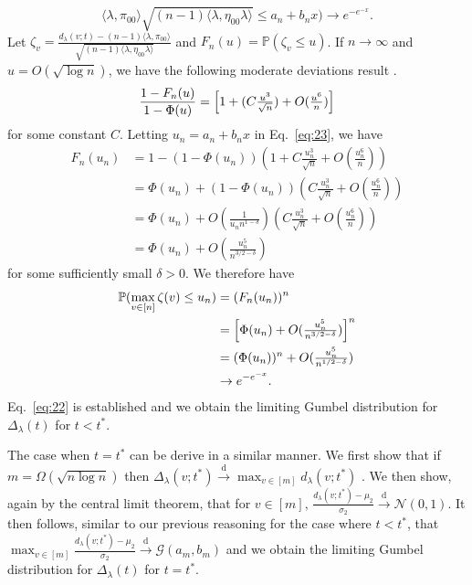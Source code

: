 \documentclass[10pt,journal,compsoc]{IEEEtran}
\theoremstyle{definition}
\begin{document}
\begin{IEEEproof}[Proposition~5]
\begin{equation}
{      \langle \lambda, \pi_{00} \rangle}{\sqrt{(n-1) \langle
        \lambda, \eta_{00} \lambda \rangle}} \leq a_n + b_n x\Big)
    \rightarrow 
    e^{-e^{-x}}. 
  \end{equation}
  Let $\zeta_v = \tfrac{d_{\lambda}(v;t) - (n-1) \langle \lambda,
    \pi_{00} \rangle}{\sqrt{(n-1) \langle \lambda, \eta_{00} \lambda
      \rangle}}$ and $F_n(u) = \mathbb{P}(\zeta_v \leq u)$. If $n
  \rightarrow \infty$ and $u = O(\sqrt{\log{n}})$, we have the
  following moderate deviations result \cite[Theorem~2, \S
  XVI.7]{feller71:_introd_probab_theor_its_applic,rubin65:_probab}.
  \begin{equation}
    \label{eq:23}
    \frac{1 - F_{n}(u)}{1 - \Phi(u)} = \Bigl[1 + (C\tfrac{u^{3}}{\sqrt{n}}) + O(\tfrac{u^{6}}{n}) \Bigr]
  \end{equation}
  for some constant $C$. Letting $u_n = a_n + b_n x$ in
  Eq.~\eqref{eq:23}, we have
  \begin{equation*}
    \begin{split}
      F_n(u_n) &= 1 - (1 - \Phi(u_n))(1 + C \tfrac{u_n^{3}}{\sqrt{n}} +
      O(\tfrac{u_n^{6}}{n})) \\
      &= \Phi(u_n) + (1 - \Phi(u_n))(C \tfrac{u_n^{3}}{\sqrt{n}} +
      O(\tfrac{u_n^6}{n})) \\
      &= \Phi(u_n) + O(\tfrac{1}{u_n n^{1- \delta}})(C \tfrac{u_n^{3}}{\sqrt{n}} +
      O(\tfrac{u_n^6}{n})) \\
      &= \Phi(u_n) + O(\tfrac{u_n^{5}}{n^{3/2 - \delta}})
    \end{split}
  \end{equation*}
  for some sufficiently small $\delta > 0$. We therefore have
  \begin{equation}
    \label{eq:25}
    \begin{split}
      \mathbb{P}(\max_{v \in [n]} \zeta(v) \leq u_n) &= (F_n(u_n))^{n} \\
      &= \Bigl[\Phi(u_n) + O(\tfrac{u_n^{5}}{n^{3/2 - \delta}})\Bigr]^{n} \\
      &= (\Phi(u_n))^{n} + O(\tfrac{u_n^{5}}{n^{1/2 - \delta}}) \\
      & \rightarrow e^{-e^{-x}}. 
    \end{split}
  \end{equation}
  Eq.~\eqref{eq:22} is established and we obtain the limiting Gumbel distribution for
  $\Delta_{\lambda}(t)$ for $t < t^{*}$.
  
  The case when $t = t^{*}$ can be derive in a similar manner. We
  first show that if $m = \Omega(\sqrt{n \log n})$ then
  $\Delta_{\lambda}(v;t^{*}) \overset{\mathrm{d}}{\longrightarrow}
  \max_{v \in [m]}{d_{\lambda}(v;t^{*})}$ \cite[Lemma
  3.1]{rukhin12}. We then show, again by
  the central limit theorem, that for $v \in [m]$,
  $\tfrac{d_{\lambda}(v;t^{*}) - \mu_2}{\sigma_2}
  \overset{\mathrm{d}}{\longrightarrow} \mathcal{N}(0,1)$. It then
  follows, similar to our previous reasoning for the case where $t <
  t^{*}$, that $\max_{v \in [m]} \tfrac{d_{\lambda}(v;t^{*}) -
    \mu_2}{\sigma_2}
  \overset{\mathrm{d}}{\longrightarrow}\mathcal{G}(a_m,b_m)$ and we
  obtain the limiting Gumbel distribution for $\Delta_{\lambda}(t)$ for $t = t^{*}$.
\end{IEEEproof}
\end{document}
